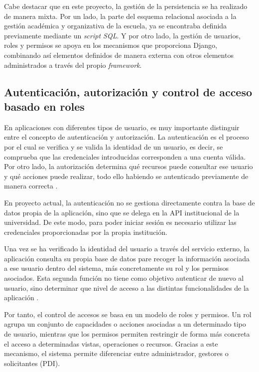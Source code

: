 Cabe destacar que en este proyecto, la gestión de la persistencia se ha realizado de manera mixta. Por un lado, la parte del esquema relacional asociada a la gestión académica y organizativa de la escuela, ya se encontraba definida previamente mediante un \textit{script SQL}. Y por otro lado, la gestión de usuarios, roles y permisos se apoya en los mecanismos que proporciona Django, combinando así elementos definidos de manera externa con otros elementos administrados a través del propio \textit{framework}.


\subsection{Autenticación, autorización y control de acceso basado en roles}

En aplicaciones con diferentes tipos de usuario, es muy importante distinguir entre el concepto de autenticación y autorización. La autenticación es el proceso por el cual se verifica y se valida la identidad de un usuario, es decir, se comprueba que las credenciales introducidas corresponden a una cuenta válida. Por otro lado, la autorización determina qué recursos puede consultar ese usuario y qué acciones puede realizar, todo ello habiendo se autenticado previamente de manera correcta \cite{authn-authz}.

En proyecto actual, la autenticación no se gestiona directamente contra la base de datos propia de la aplicación, sino que se delega en la API institucional de la universidad. De este modo, para poder iniciar sesión es necesario utilizar las credenciales proporcionadas por la propia institución.

Una vez se ha verificado la identidad del usuario a través del servicio externo, la aplicación consulta su propia base de datos pare recoger la información asociada a ese usuario dentro del sistema, más concretamente su rol y los permisos asociados. Esta segunda función no tiene como objetivo autenticar de nuevo al usuario, sino determinar que nivel de acceso a las distintas funcionalidades de la aplicación \cite{authn-authz}.

Por tanto, el control de accesos se basa en un modelo de roles y permisos. Un rol agrupa un conjunto de capacidades o acciones asociadas a un determinado tipo de usuario, mientras que los permisos permiten restringir de forma más concreta el acceso a determinadas vistas, operaciones o recursos. Gracias a este mecanismo, el sistema permite diferenciar entre administrador, gestores o solicitantes (PDI).

